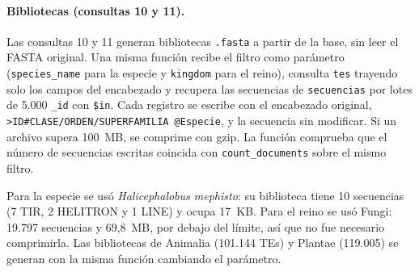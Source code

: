 \documentclass[unnumsec,namedate,webpdf,contemporary,large]{oup-authoring-template}
\begin{document}
\paragraph{Bibliotecas (consultas 10 y 11).} Las consultas 10 y 11 generan bibliotecas \texttt{.fasta} a partir de la base, sin leer el FASTA original. Una misma funci\'on recibe el filtro como par\'ametro (\texttt{species\_name} para la especie y \texttt{kingdom} para el reino), consulta \texttt{tes} trayendo solo los campos del encabezado y recupera las secuencias de \texttt{secuencias} por lotes de 5.000 \texttt{\_id} con \texttt{\$in}. Cada registro se escribe con el encabezado original, \texttt{>ID\#CLASE/ORDEN/SUPERFAMILIA @Especie}, y la secuencia sin modificar. Si un archivo supera 100~MB, se comprime con gzip. La funci\'on comprueba que el n\'umero de secuencias escritas coincida con \texttt{count\_documents} sobre el mismo filtro.

Para la especie se us\'o \textit{Halicephalobus mephisto}: su biblioteca tiene 10 secuencias (7 TIR, 2 HELITRON y 1 LINE) y ocupa 17~KB. Para el reino se us\'o Fungi: 19.797 secuencias y 69,8~MB, por debajo del l\'imite, as\'i que no fue necesario comprimirla. Las bibliotecas de Animalia (101.144 TEs) y Plantae (119.005) se generan con la misma funci\'on cambiando el par\'ametro.
\end{document}
